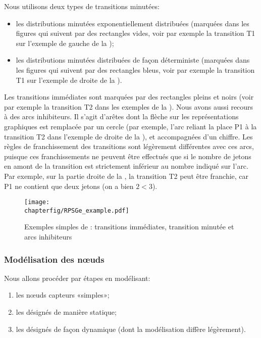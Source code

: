 Nous utilisons deux types de transitions minutées:
\begin{itemize}
    \item les distributions minutées exponentiellement distribuées (marquées dans les figures qui suivent par des rectangles vides, voir par exemple la transition \textsf{T1} sur l'exemple de gauche de la );
    \item les distributions minutées distribuées de façon déterministe (marquées dans les figures qui suivent par des rectangles bleus, voir par exemple la transition \textsf{T1} sur l'exemple de droite de la ).
\end{itemize}
Les transitions immédiates sont marquées par des rectangles pleins et noirs (voir par exemple la transition \textsf{T2} dans les exemples de la ).
Nous avons aussi recours à des arcs inhibiteurs.
Il s'agit d'arêtes dont la flèche sur les représentations graphiques est remplacée par un cercle (par exemple, l'arc reliant la place \textsf{P1} à la transition \textsf{T2} dans l'exemple de droite de la ), et accompagnées d'un chiffre.
Les règles de franchissement des transitions sont légèrement différentes avec ces arcs, puisque ces franchissements ne peuvent être effectués que si le nombre de jetons en amont de la transition est strictement inférieur au nombre indiqué sur l'arc.
Par exemple, sur la partie droite de la , la transition \textsf{T2} peut être franchie, car \textsf{P1} ne contient que deux jetons (on a bien $2<3$).
\begin{figure}[ht]
    \centering
    \texttt{[image: \\chapterfig/RPSGe\_example.pdf]}
    \caption{Exemples simples de \rpsge: transitions immédiates, transition minutée et arcs inhibiteurs}\label{sa:fig:gspnex1}
\end{figure}

        \subsubsection{Modélisation des nœuds}
Nous allons procéder par étapes en modélisant:
\begin{enumerate}
    \item les nœuds capteurs «simples»;
    \item les \cns désignés de manière statique;
    \item les \cns désignés de façon dynamique (dont la modélisation diffère légèrement).
\end{enumerate}

